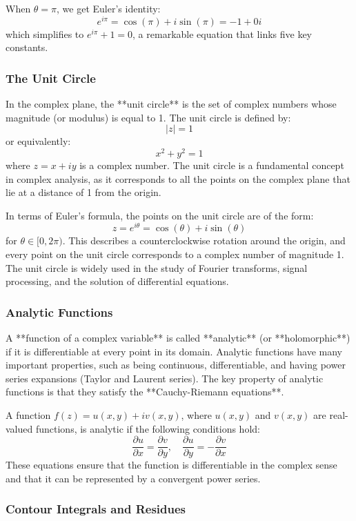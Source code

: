 \documentclass{article}
\begin{document}
When \( \theta = \pi \), we get Euler’s identity:
\[
e^{i\pi} = \cos(\pi) + i\sin(\pi) = -1 + 0i
\]
which simplifies to \( e^{i\pi} + 1 = 0 \), a remarkable equation that links five key constants.

\subsubsection*{The Unit Circle}

In the complex plane, the **unit circle** is the set of complex numbers whose magnitude (or modulus) is equal to 1. The unit circle is defined by:
\[
|z| = 1
\]
or equivalently:
\[
x^2 + y^2 = 1
\]
where \( z = x + iy \) is a complex number. The unit circle is a fundamental concept in complex analysis, as it corresponds to all the points on the complex plane that lie at a distance of 1 from the origin. 

In terms of Euler’s formula, the points on the unit circle are of the form:
\[
z = e^{i\theta} = \cos(\theta) + i\sin(\theta)
\]
for \( \theta \in [0, 2\pi) \). This describes a counterclockwise rotation around the origin, and every point on the unit circle corresponds to a complex number of magnitude 1. The unit circle is widely used in the study of Fourier transforms, signal processing, and the solution of differential equations.

\subsubsection*{Analytic Functions}

A **function of a complex variable** is called **analytic** (or **holomorphic**) if it is differentiable at every point in its domain. Analytic functions have many important properties, such as being continuous, differentiable, and having power series expansions (Taylor and Laurent series). The key property of analytic functions is that they satisfy the **Cauchy-Riemann equations**.

A function \( f(z) = u(x, y) + iv(x, y) \), where \( u(x, y) \) and \( v(x, y) \) are real-valued functions, is analytic if the following conditions hold:
\[
\frac{\partial u}{\partial x} = \frac{\partial v}{\partial y}, \quad \frac{\partial u}{\partial y} = -\frac{\partial v}{\partial x}
\]
These equations ensure that the function is differentiable in the complex sense and that it can be represented by a convergent power series.

\subsubsection*{Contour Integrals and Residues}
\end{document}
